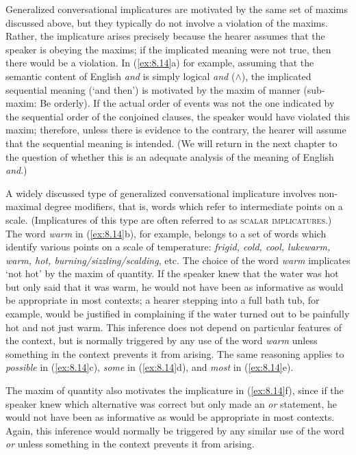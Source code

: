 Generalized conversational implicatures are motivated by the same set of maxims discussed above, but they typically do not involve a violation of the maxims. Rather, the implicature arises precisely because the hearer assumes that the speaker is obeying the maxims; if the implicated meaning were not true, then there would be a violation. In (\ref{ex:8.14}a) for example, assuming that the semantic content of English \textit{and} is simply logical \textit{and} ($\wedge$), the implicated sequential meaning (‘and then’) is motivated by the maxim of manner (sub-maxim: Be orderly). If the actual order of events was not the one indicated by the sequential order of the conjoined clauses, the speaker would have violated this maxim; therefore, unless there is evidence to the contrary, the hearer will assume that the sequential meaning is intended. (We will return in the next chapter to the question of whether this is an adequate analysis of the meaning of English \textit{and}.)



A widely discussed type of generalized conversational implicature involves non-maximal degree modifiers, that is, words which refer to intermediate points on a scale. (Implicatures of this type are often referred to as \textsc{scalar implicatures}.) The word \textit{warm} in (\ref{ex:8.14}b), for example, belongs to a set of words which identify various points on a scale of temperature: \textit{frigid, cold, cool, lukewarm, warm, hot, burning/sizzling/scalding}, etc. The choice of the word \textit{warm} implicates ‘not hot’ by the maxim of quantity. If the speaker knew that the water was hot but only said that it was warm, he would not have been as informative as would be appropriate in most contexts; a hearer stepping into a full bath tub, for example, would be justified in complaining if the water turned out to be painfully hot and not just warm. This inference does not depend on particular features of the context, but is normally triggered by any use of the word \textit{warm} unless something in the context prevents it from arising. The same reasoning applies to \textit{possible} in (\ref{ex:8.14}c), \textit{some} in (\ref{ex:8.14}d), and \textit{most} in (\ref{ex:8.14}e).



The maxim of quantity also motivates the implicature in (\ref{ex:8.14}f), since if the speaker knew which alternative was correct but only made an \textit{or} statement, he would not have been as informative as would be appropriate in most contexts. Again, this inference would normally be triggered by any similar use of the word \textit{or} unless something in the context prevents it from arising.




